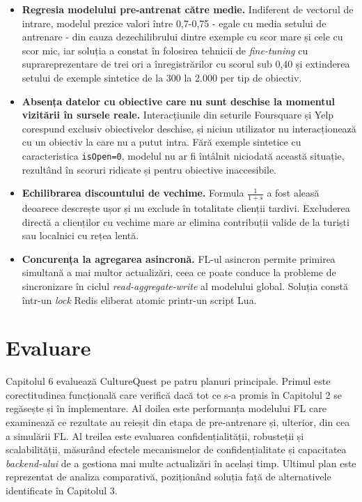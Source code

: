 \documentclass[12pt,a4paper]{report}
\begin{document}
\begin{itemize}
\item \textbf{Regresia modelului pre-antrenat către medie.} Indiferent de vectorul de intrare, modelul prezice valori între 0,7-0,75 - egale cu media setului de antrenare - din cauza dezechilibrului dintre exemple cu scor mare și cele cu scor mic, iar soluția a constat în folosirea tehnicii de \textit{fine-tuning} cu suprareprezentare de trei ori a înregistrărilor cu scorul sub 0,40 și extinderea setului de exemple sintetice de la 300 la 2.000 per tip de obiectiv.

\item \textbf{Absența datelor cu obiective care nu sunt deschise la momentul vizitării în sursele reale.} Interacțiunile din seturile Foursquare și Yelp corespund exclusiv obiectivelor deschise, și niciun utilizator nu interacționează cu un obiectiv la care nu a putut intra. Fără exemple sintetice cu caracteristica \texttt{isOpen=0}, modelul nu ar fi întâlnit niciodată această situație, rezultând în scoruri ridicate și pentru obiective inaccesibile.

\item \textbf{Echilibrarea discountului de vechime.} Formula $\frac{1}{1+s}$ a fost aleasă deoarece descrește ușor și nu exclude în totalitate clienții tardivi. Excluderea directă a clienților cu vechime mare ar elimina contribuții valide de la turiști sau localnici cu rețea lentă.

\item \textbf{Concurența la agregarea asincronă.} FL-ul asincron permite primirea simultană a mai multor actualizări, ceea ce poate conduce la probleme de sincronizare în ciclul \textit{read-aggregate-write} al modelului global. Soluția constă într-un \textit{lock} Redis eliberat atomic printr-un script Lua.
\end{itemize}

\chapter{Evaluare}

Capitolul 6 evaluează CultureQuest pe patru planuri principale. Primul este corectitudinea funcțională care verifică dacă tot ce s-a promis în Capitolul 2 se regăsește și în implementare. Al doilea este performanța modelului FL care examinează ce rezultate au reieșit din etapa de pre-antrenare și, ulterior, din cea a simulării FL. Al treilea este evaluarea confidențialității, robusteții și scalabilității, măsurând efectele mecanismelor de confidențialitate și capacitatea \textit{backend-ului} de a gestiona mai multe actualizări în același timp. Ultimul plan este reprezentat de analiza comparativă, poziționând soluția față de alternativele identificate în Capitolul 3.
\end{document}
